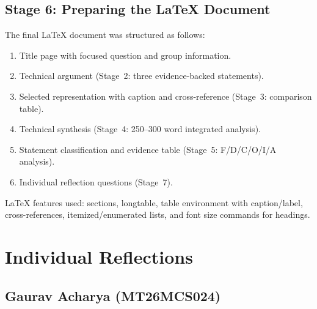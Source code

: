 \documentclass[11pt, a4paper]{article}
\begin{document}
\subsection{Stage 6: Preparing the LaTeX Document}
The final LaTeX document was structured as follows:
\begin{enumerate}[nosep]
    \item Title page with focused question and group information.
    \item Technical argument (Stage~2: three evidence-backed statements).
    \item Selected representation with caption and cross-reference (Stage~3: comparison table).
    \item Technical synthesis (Stage~4: 250--300 word integrated analysis).
    \item Statement classification and evidence table (Stage~5: F/D/C/O/I/A analysis).
    \item Individual reflection questions (Stage~7).
\end{enumerate}
LaTeX features used: sections, longtable, table environment with caption/label, cross-references, itemized/enumerated lists, and font size commands for headings.

\section{Individual Reflections}

\subsection{Gaurav Acharya (MT26MCS024)}
\end{document}
